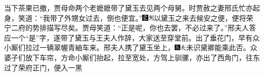 当下茶果已撤，贾母命两个老嬷嬷带了黛玉去见两个母舅。时贾赦之妻邢氏忙亦起身，笑道：“我带了外甥女过去，倒也便宜。”{\includegraphics[width=3mm]{../Images/00006}\includegraphics[width=3mm]{../Images/00011}\footnotesize \kaishu 以黛玉之来去候安之便，便将荣宁二府的势排描写尽矣。}贾母笑道：“正是呢，你也去罢，不必过来了。”邢夫人答应一个“是”字，遂带了黛玉与王夫人作辞，大家送至穿堂前。出了垂花门，早有众小厮们拉过一辆翠幄青紬车来。邢夫人携了黛玉坐上，{\includegraphics[width=3mm]{../Images/00009}\includegraphics[width=3mm]{../Images/00012}\footnotesize \kaishu 未识黛卿能乘此否。}众婆子们放下车帘，方命小厮们抬起，拉至宽处，方驾上驯骡，亦出了西角门，往东过了荣府正门，便入一黑